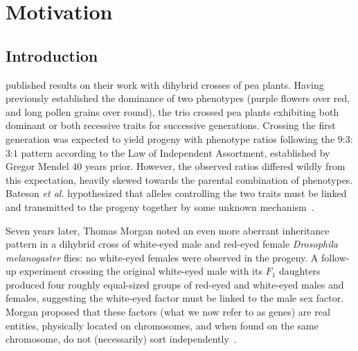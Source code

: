\chapter{Motivation}
\label{ch:motivation}

\section{Introduction}

 published results on their work with dihybrid crosses of pea plants.  Having previously established the dominance of two phenotypes (purple flowers over red, and long pollen grains over round), the trio crossed pea plants exhibiting both dominant or both recessive traits for successive generations.  Crossing the first generation was expected to yield progeny with phenotype ratios following the $9$:$3$:$3$:$1$ pattern according to the Law of Independent Assortment, established by Gregor Mendel $40$ years prior.  However, the observed ratios differed wildly from this expectation, heavily skewed towards the parental combination of phenotypes.  Bateson \textit{et al.} hypothesized that alleles controlling the two traits must be linked and transmitted to the progeny together by some unknown mechanism~\cite{Bateson:1908dq}.

Seven years later, Thomas Morgan noted an even more aberrant inheritance pattern in a dihybrid cross of white-eyed male and red-eyed female \textit{Drosophila melanogaster} flies: no white-eyed females were observed in the progeny.  A follow-up experiment crossing the original white-eyed male with its $F_{1}$ daughters produced four roughly equal-sized groups of red-eyed and white-eyed males and females, suggesting the white-eyed factor must be linked to the male sex factor.  Morgan proposed that these factors (what we now refer to as genes) are real entities, physically located on chromosomes, and when found on the same chromosome, do not (necessarily) sort independently~\cite{Morgan:1910hg}.

